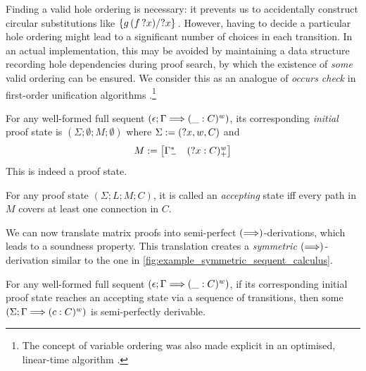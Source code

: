 \documentclass[twoside]{report}
\begin{document}
Finding a valid hole ordering is necessary: it prevents us to accidentally construct circular substitutions like $\subst {?x} {\app g {(\app f {?x})}} {}$. However, having to decide a particular hole ordering might lead to a significant number of choices in each transition. In an actual implementation, this may be avoided by maintaining a data structure recording hole dependencies during proof search, by which the existence of \emph{some} valid ordering can be ensured. We consider this as an analogue of \emph{occurs check} in first-order unification algorithms \cite{robinson1965machine}.\footnote{The concept of variable ordering was also made explicit in an optimised, linear-time algorithm \cite{martelli1982efficient}.}

\begin{definition}
    \label{def:matrix_initial_states}
    For any well-formed full sequent $(\epsilon; \Gamma \vdashs (\_ : C)^w)$, its corresponding \emph{initial} proof state is $(\Sigma; \emptyset; M; \emptyset)$ where $\Sigma \defeq ({?x}, w, C)$ and
    $$
        M \defeq \mat{\Gamma^\ast_- & ({?x} : C)^w_+}
    $$
    This is indeed a proof state.
\end{definition}

\begin{definition}
    \label{def:matrix_accepting_states}
    For any proof state $(\Sigma; L; M; C)$, it is called an \emph{accepting} state iff every path in $M$ covers at least one connection in $C$.
\end{definition}

We can now translate matrix proofs into semi-perfect $(\vdashs)$-derivations, which leads to a soundness property. This translation creates a \emph{symmetric} $(\vdashs)$-derivation similar to the one in \cref{fig:example_symmetric_sequent_calculus}.

\begin{proposition}[Correspondence]
    \label{thm:matrix_to_defocused_calculus}
    For any well-formed full sequent $(\epsilon; \Gamma \vdashs (\_ : C)^w)$, if its corresponding initial proof state reaches an accepting state via a sequence of transitions, then some $(\Sigma; \Gamma \vdashs (c : C)^w)$ is semi-perfectly derivable.
\end{proposition}
\end{document}
